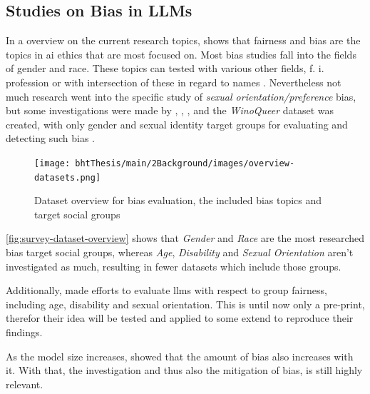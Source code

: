 \subsection{Studies on Bias in LLMs}
In a overview on the current research topics, \citet{hagendorff-mapping} shows that fairness and bias are the topics in \acrshort{ai} ethics that are most focused on.
Most bias studies fall into the fields of gender and race. These topics can tested with various other fields, f. i. profession \citep{bolukbasi} or with intersection of these in regard to names \citep{haim2024whats}.
Nevertheless not much research went into the specific study of \textit{sexual orientation/preference} bias, but some investigations were made by \citet{dhingra2023queer}, \citet{nozza}, \citet{lucyli}, and the \textit{WinoQueer} dataset was created, with only gender and sexual identity target groups for evaluating and detecting such bias \citep{winoqueer}. 


\begin{figure}[ht]
    \centering
    \texttt{[image: bhtThesis/main/2Background/images/overview-datasets.png]}
        \caption[Dataset overview for bias evaluation \citep{biassurvey}]{Dataset overview for bias evaluation, the included bias topics and target social groups \citep{biassurvey}}
    \label{fig:survey-dataset-overview}
\end{figure}

\autoref{fig:survey-dataset-overview} shows that \textit{Gender} and \textit{Race} are the most researched bias target social groups, whereas \textit{Age}, \textit{Disability} and \textit{Sexual Orientation} aren't investigated as much, resulting in fewer datasets which include those groups. 

Additionally, \citet{tian2024softprompt} made efforts to evaluate \acrshort{llms} with respect to group fairness, including age, disability and  sexual orientation. This is until now only a pre-print, therefor their idea will be tested and applied to some extend to reproduce their findings. 

As the model size increases, \citet{nadeem2020stereoset} showed that the amount of bias also increases with it. 
With that, the investigation and thus also the mitigation of bias, is still highly relevant. 



